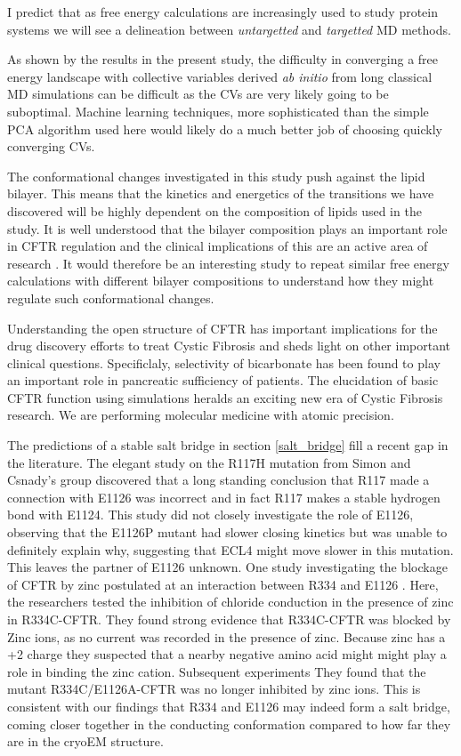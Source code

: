 I predict that as free energy calculations are increasingly used to study protein systems we will see a delineation between \textit{untargetted} and \textit{targetted} MD methods.

As shown by the results in the present study, the difficulty in converging a free energy landscape with collective variables derived \textit {ab initio} from long classical MD simulations can be difficult as the CVs are very likely going to be suboptimal. Machine learning techniques, more sophisticated than the simple PCA algorithm used here would likely do a much better job of choosing quickly converging CVs. 

The conformational changes investigated in this study push against the lipid bilayer. This means that the kinetics and energetics of the transitions we have discovered will be highly dependent on the composition of lipids used in the study. It is well understood that the bilayer composition plays an important role in CFTR regulation and the clinical implications of this are an active area of research \cite{cui2020, cottrill2020}. It would therefore be an interesting study to repeat similar free energy calculations with different bilayer compositions to understand how they might regulate such conformational changes.

Understanding the open structure of CFTR has important implications for the drug discovery efforts to treat Cystic Fibrosis and sheds light on other important clinical questions. Specificlaly, selectivity of bicarbonate has been found to play an important role in pancreatic sufficiency of patients. The elucidation of basic CFTR function using simulations heralds an exciting new era of Cystic Fibrosis research. We are performing molecular medicine with atomic precision. 


The predictions of a stable salt bridge in section \ref{salt_bridge} fill a recent gap in the literature. The elegant study on the R117H mutation from Simon and Csnady's group \cite{simon2021}  discovered that a long standing conclusion that R117 made a connection with E1126 was incorrect and in fact R117 makes a stable hydrogen bond with E1124. This study did not closely investigate the role of E1126, observing that the E1126P mutant had slower closing kinetics but was unable to definitely explain why, suggesting that ECL4 might move slower in this mutation. This leaves the partner of E1126 unknown. One study investigating the blockage of CFTR by zinc postulated at an interaction between R334 and E1126 \cite{wang2016}. Here, the researchers tested the inhibition of chloride conduction in the presence of zinc in R334C-CFTR. They found strong evidence that R334C-CFTR was blocked by Zinc ions, as no current was recorded in the presence of zinc. Because zinc has a +2 charge they suspected that a nearby negative amino acid might might play a role in binding the zinc cation. Subsequent experiments They found that the mutant R334C/E1126A-CFTR was no longer inhibited by zinc ions. This is consistent with our findings that R334 and E1126 may indeed form a salt bridge, coming closer together in the conducting conformation compared to how far they are in the cryoEM structure.  

